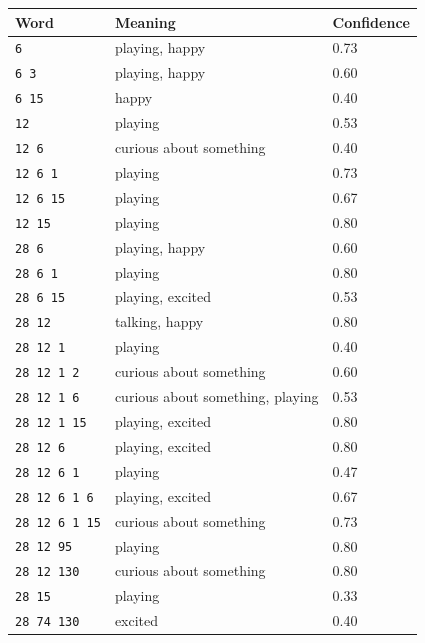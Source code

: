 \begin{table}[th]
	\centering
	\small
	\begin{tabular}{lll}
		\hline
		\textbf{Word} & \textbf{Meaning} & \textbf{Confidence}\\
		\hline
		\verb|6| & playing, happy & 0.73\\
		\verb|6 3| & playing, happy & 0.60\\
		\verb|6 15| & happy & 0.40\\
		\verb|12| & playing & 0.53\\
		\verb|12 6| & curious about something & 0.40\\
		\verb|12 6 1| & playing & 0.73\\
		\verb|12 6 15| & playing & 0.67\\
		\verb|12 15| & playing & 0.80\\
		\verb|28 6| & playing, happy & 0.60\\
		\verb|28 6 1| & playing & 0.80\\
		\verb|28 6 15| & playing, excited & 0.53\\
		\verb|28 12| & talking, happy & 0.80\\
		\verb|28 12 1| & playing & 0.40\\
		\verb|28 12 1 2| & curious about something & 0.60\\
		\verb|28 12 1 6| & curious about something, playing & 0.53\\
		\verb|28 12 1 15| & playing, excited & 0.80\\
		\verb|28 12 6| & playing, excited & 0.80\\
		\verb|28 12 6 1| & playing & 0.47\\
		\verb|28 12 6 1 6| & playing, excited & 0.67\\
		\verb|28 12 6 1 15| & curious about something & 0.73\\
		\verb|28 12 95| & playing & 0.80\\
		\verb|28 12 130| & curious about something & 0.80\\
		\verb|28 15| & playing & 0.33\\
		\verb|28 74 130| & excited & 0.40\\

\end{tabular}
\end{table}

